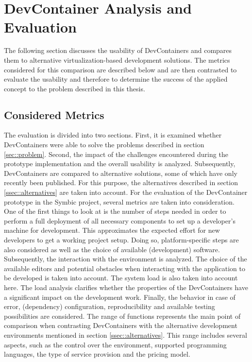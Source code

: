 
\section{DevContainer Analysis and Evaluation}\label{sec::eval}
The following section discusses the usability of DevContainers and compares them to alternative virtualization-based development solutions. The metrics considered for this comparison are described below and are then contrasted to evaluate the usability and therefore to determine the success of the applied concept to the problem described in this thesis.

    \subsection{Considered Metrics}
    The evaluation is divided into two sections. First, it is examined whether DevContainers were able to solve the problems described in section \ref{sec::problem}. Second, the impact of the challenges encountered during the prototype implementation and the overall usability is analyzed. Subsequently, DevContainers are compared to alternative solutions, some of which have only recently been published. For this purpose, the alternatives described in section \ref{ssec::alternatives} are taken into account.\newline
    For the evaluation of the DevContainer prototype in the Symbic project, several metrics are taken into consideration. One of the first things to look at is the number of steps needed in order to perform a full deployment of all necessary components to set up a developer's machine for development. This approximates the expected effort for new developers to get a working project setup. Doing so, platform-specific steps are also considered as well as the choice of available (development) software. Subsequently, the interaction with the environment is analyzed. The choice of the available editors and potential obstacles when interacting with the application to be developed is taken into account. The system load is also taken into account here. The load analysis clarifies whether the properties of the DevContainers have a significant impact on the development work. Finally, the behavior in case of error, (dependency) configuration, reproducibility and available testing possibilities are considered. \newline
    The range of functions represents the main point of comparison when contrasting DevContainers with the alternative development environments mentioned in section \ref{ssec::alternatives}. This range includes several aspects, such as the control over the environment, supported programming languages, the type of service provision and the pricing model.

